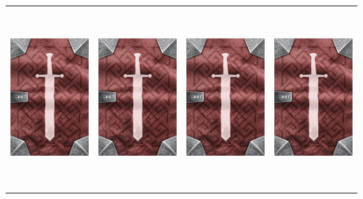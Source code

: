 \documentclass{minimal}
\begin{document}
\newpage
{\setlength{\tabcolsep}{1mm}
\begin{longtable}{llll}
\includegraphics[width=44mm,height=68mm]{./1-14/gh-002-winged-shoes-back.png} &
\includegraphics[width=44mm,height=68mm]{./1-14/gh-002-winged-shoes-back.png} &
\includegraphics[width=44mm,height=68mm]{./1-14/gh-001-boots-of-striding-back.png} &
\includegraphics[width=44mm,height=68mm]{./1-14/gh-001-boots-of-striding-back.png}\\ 

\end{longtable}}
\end{document}
